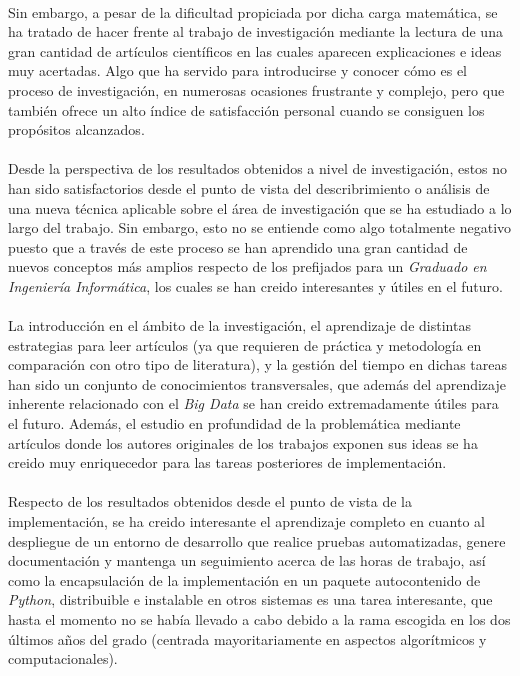 \documentclass{subfiles}
\begin{document}
      \paragraph{}
      Sin embargo, a pesar de la dificultad propiciada por dicha carga matemática, se ha tratado de hacer frente al trabajo de investigación mediante la lectura de una gran cantidad de artículos científicos en las cuales aparecen explicaciones e ideas muy acertadas. Algo que ha servido para introducirse y conocer cómo es el proceso de investigación, en numerosas ocasiones frustrante y complejo, pero que también ofrece un alto índice de satisfacción personal cuando se consiguen los propósitos alcanzados.

      \paragraph{}
      Desde la perspectiva de los resultados obtenidos a nivel de investigación, estos no han sido satisfactorios desde el punto de vista del describrimiento o análisis de una nueva técnica aplicable sobre el área de investigación que se ha estudiado a lo largo del trabajo. Sin embargo, esto no se entiende como algo totalmente negativo puesto que a través de este proceso se han aprendido una gran cantidad de nuevos conceptos más amplios respecto de los prefijados para un \emph{Graduado en Ingeniería Informática}, los cuales se han creido interesantes y útiles en el futuro.

      \paragraph{}
      La introducción en el ámbito de la investigación, el aprendizaje de distintas estrategias para leer artículos (ya que requieren de práctica y metodología en comparación con otro tipo de literatura), y la gestión del tiempo en dichas tareas han sido un conjunto de conocimientos transversales, que además del aprendizaje inherente relacionado con el \emph{Big Data} se han creido extremadamente útiles para el futuro. Además, el estudio en profundidad de la problemática mediante artículos donde los autores originales de los trabajos exponen sus ideas se ha creido muy enriquecedor para las tareas posteriores de implementación.

      \paragraph{}
      Respecto de los resultados obtenidos desde el punto de vista de la implementación, se ha creido interesante el aprendizaje completo en cuanto al despliegue de un entorno de desarrollo que realice pruebas automatizadas, genere documentación y mantenga un seguimiento acerca de las horas de trabajo, así como la encapsulación de la implementación en un paquete autocontenido de \emph{Python}, distribuible e instalable en otros sistemas es una tarea interesante, que hasta el momento no se había llevado a cabo debido a la rama escogida en los dos últimos años del grado (centrada mayoritariamente en aspectos algorítmicos y computacionales).
\end{document}
